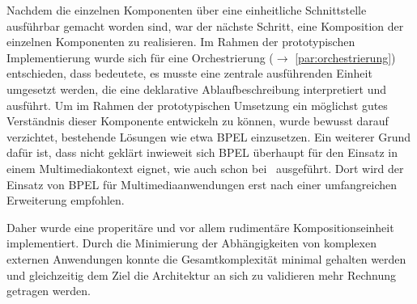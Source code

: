   Nachdem die einzelnen Komponenten über eine einheitliche Schnittstelle ausführbar gemacht worden sind, war der nächste Schritt, eine Komposition der einzelnen Komponenten zu realisieren. Im Rahmen der prototypischen Implementierung wurde sich für eine Orchestrierung ($\to$ \ref{par:orchestrierung}) entschieden, dass bedeutete, es musste eine zentrale ausführenden Einheit umgesetzt werden, die eine deklarative Ablaufbeschreibung interpretiert und ausführt. Um im Rahmen der prototypischen Umsetzung ein möglichst gutes Verständnis dieser Komponente entwickeln zu können, wurde bewusst darauf verzichtet, bestehende Lösungen wie etwa BPEL einzusetzen. Ein weiterer Grund dafür ist, dass nicht geklärt inwieweit sich BPEL überhaupt für den Einsatz in einem Multimediakontext eignet, wie auch schon bei~\citep{samma08} ausgeführt. Dort wird der Einsatz von BPEL für Multimediaanwendungen erst nach einer umfangreichen Erweiterung empfohlen.
  
  Daher wurde eine properitäre und vor allem rudimentäre Kompositionseinheit implementiert. Durch die Minimierung der Abhängigkeiten von komplexen externen Anwendungen konnte die Gesamtkomplexität minimal gehalten werden und gleichzeitig dem Ziel die Architektur an sich zu validieren mehr Rechnung getragen werden. 
  

